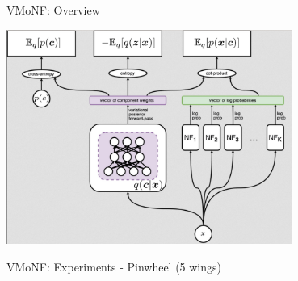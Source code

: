 \documentclass{beamer}
\begin{document}
\begin{frame}{VMoNF: Overview}
\protect\hypertarget{vmonf-overview}{}

\centering

\includegraphics[width=0.7\textwidth]{figures/overview.pdf}

\end{frame}

\begin{frame}{VMoNF: Experiments - Pinwheel (5 wings)}
\protect\hypertarget{vmonf-experiments---pinwheel-5-wings}{}

\centering
{}
\hfill
{}

\end{frame}
\end{document}
